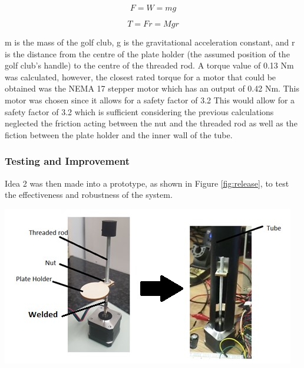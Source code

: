 \documentclass[11pt,landscape]{article}
\newenvironment{Figure}
  {\par\medskip\noindent\minipage{\linewidth}}
  {\endminipage\par\medskip}
\begin{document}
\begin{multicols}{2}
    \begin{center}
        \begin{equation}
            F = W = mg
            \label{eq:raising_force}
        \end{equation}
    \end{center}
    \begin{center}
        \begin{equation}
            T = Fr = Mgr
            \label{eq:raising_torque}
        \end{equation}
    \end{center}
    
    m is the mass of the golf club, g is the gravitational acceleration
    constant, and r is the distance from the centre of the plate holder (the
    assumed position of the golf club’s handle) to the centre of the threaded
    rod. A torque value of 0.13 Nm was calculated, however, the closest rated
    torque for a motor that could be obtained was the NEMA 17 stepper motor
    which has an output of 0.42 Nm. This motor was chosen since it allows for a
    safety factor of 3.2 This would allow for a safety factor of 3.2 which is
    sufficient considering the previous calculations neglected the friction
    acting between the nut and the threaded rod as well as the fiction between
    the plate holder and the inner wall of the tube. 
    
    
    \subsubsection{Testing and Improvement}
    Idea 2 was then made into a prototype, as shown in Figure \ref{fig:release},
    to test the effectiveness and robustness of the system. 
    
    \begin{Figure}
        \begin{center}
            \includegraphics[width=\textwidth]{Figure20.jpg}
            \label{fig:release}
        \end{center}
    \end{Figure}
    

\end{multicols}
\end{document}

